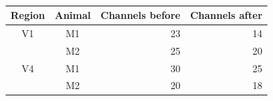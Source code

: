 \begin{table}[bthp]
\begin{center}
\begin{tabular}{ccrr}
\toprule
Region  & Animal    & Channels before   & Channels after \\
\midrule
V1      & M1        & 23                & 14 \\
        & M2        & 25                & 20 \\
V4      & M1        & 30                & 25 \\
        & M2        & 20                & 18 \\
\bottomrule
\end{tabular}
\end{center}
\caption{
}
\label{tab:nchannels_restricted}
\end{table}


